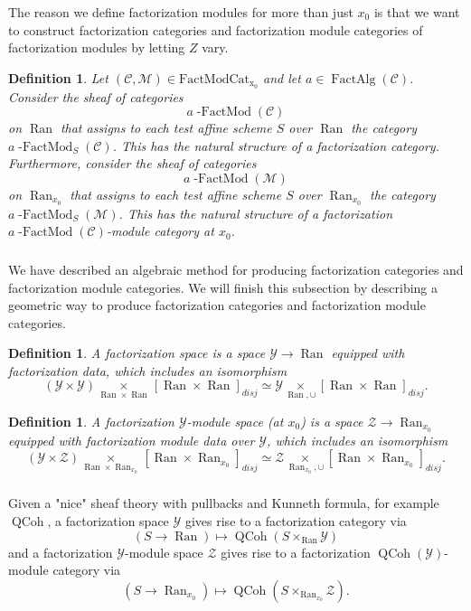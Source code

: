 \documentclass[10pt,a4paper]{amsart}
\newtheorem{defn}[subsubsection]{Definition}
\newcommand{\on}[1]{\operatorname{#1}}
\newcommand{\QCoh}{\on{QCoh}}
\newcommand{\Ran}{\on{Ran}}
\newcommand{\FactModCat}{\on{FactModCat_{x_0}}}
\newcommand{\sssec}[1]{\subsubsection{}}
\begin{document}
\sssec{}
The reason we define factorization modules for more than just $x_0$ is that we want to construct factorization categories and factorization module categories of factorization modules by letting $Z$ vary.

\begin{defn}
    Let $(\mathcal{C}, \mathcal{M}) \in \FactModCat$ and let $a \in \on{FactAlg}(\mathcal{C})$. Consider the sheaf of categories 
    $$
    a\on{-FactMod}(\mathcal{C})
    $$
    on $\Ran$ that assigns to each test affine scheme $S$ over $\Ran$ the category $a\on{-FactMod}_S(\mathcal{C})$. This has the natural structure of a factorization category. Furthermore, consider the sheaf of categories 
    $$
    a\on{-FactMod}(\mathcal{M})
    $$
    on $\Ran_{x_0}$ that assigns to each test affine scheme $S$ over $\Ran_{x_0}$ the category
    $a\on{-FactMod}_S(\mathcal{M})$. This has the natural structure of a factorization $a\on{-FactMod}(\mathcal{C})$-module category at $x_0$.
\end{defn}

\sssec{}
We have described an algebraic method for producing factorization categories and factorization module categories. We will finish this subsection by describing a geometric way to produce factorization categories and factorization module categories.

\begin{defn}
    A factorization space is a space $\mathcal{Y} \to \Ran$ equipped with factorization data, which includes an isomorphism
    $$
    (\mathcal{Y} \times \mathcal{Y}) \underset{\Ran \times \Ran}{\times} [\Ran \times \Ran]_{disj} \simeq \mathcal{Y} \underset{\Ran, \cup}{\times} [\Ran \times \Ran]_{disj}.
    $$
\end{defn}

\begin{defn}
    A factorization $\mathcal{Y}$-module space (at $x_0$) is a space $\mathcal{Z} \to \Ran_{x_0}$ equipped with factorization module data over $\mathcal{Y}$, which includes an isomorphism
    $$
    (\mathcal{Y} \times \mathcal{Z}) \underset{\Ran \times \Ran_{x_0}}{\times} [\Ran \times \Ran_{x_0}]_{disj} \simeq \mathcal{Z} \underset{\Ran_{x_0}, \cup}{\times} [\Ran \times \Ran_{x_0}]_{disj}.
    $$
\end{defn}

\sssec{}
    Given a "nice" sheaf theory with pullbacks and Kunneth formula, for example $\QCoh$, a factorization space $\mathcal{Y}$ gives rise to a factorization category via
    $$
    (S \to \Ran) \mapsto \QCoh(S \times_{\Ran} \mathcal{Y})
    $$
    and a factorization $\mathcal{Y}$-module space $\mathcal{Z}$ gives rise to a factorization $\QCoh(\mathcal{Y})$-module category via
    $$
    (S \to \Ran_{x_0}) \mapsto \QCoh(S \times_{\Ran_{x_0}} \mathcal{Z}).
    $$
\end{document}
